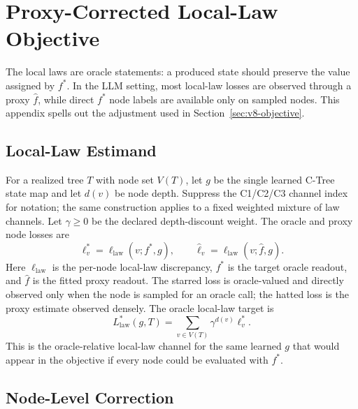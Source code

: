 \section{Proxy-Corrected Local-Law Objective}
\label{app:v8-objective-ipw}

The local laws are oracle statements: a produced state should preserve the
value assigned by \(f^\ast\). In the LLM setting, most local-law losses are
observed through a proxy \(\widehat f\), while direct \(f^\ast\) node labels are
available only on sampled nodes. This appendix spells out the adjustment used
in Section~\ref{sec:v8-objective}.

\subsection{Local-Law Estimand}
\label{app:v8-local-law-estimand}

For a realized tree \(T\) with node set \(V(T)\), let \(g\) be the single
learned C-Tree state map and let \(d(v)\) be node depth. Suppress the C1/C2/C3
channel index for notation; the same construction applies to a fixed weighted
mixture of law channels. Let \(\gamma\ge 0\) be the declared depth-discount
weight. The oracle and proxy node losses are
\[
  \ell_v^\ast=\ell_{\mathrm{law}}(v;f^\ast,g),
  \qquad
  \widehat\ell_v=\ell_{\mathrm{law}}(v;\widehat f,g).
\]
Here \(\ell_{\mathrm{law}}\) is the per-node local-law discrepancy,
\(f^\ast\) is the target oracle readout, and \(\widehat f\) is the fitted
proxy readout. The starred loss is oracle-valued and directly observed only
when the node is sampled for an oracle call; the hatted loss is the proxy
estimate observed densely.
The oracle local-law target is
\begin{equation}
\label{eq:v8-app-oracle-law-target}
  L_{\mathrm{law}}^\ast(g,T)
  =
  \sum_{v\in V(T)}
  \gamma^{d(v)}\ell_v^\ast .
\end{equation}
This is the oracle-relative local-law channel for the same learned \(g\) that
would appear in the objective if every node could be evaluated with
\(f^\ast\).

\subsection{Node-Level Correction}
\label{app:v8-node-correction}

